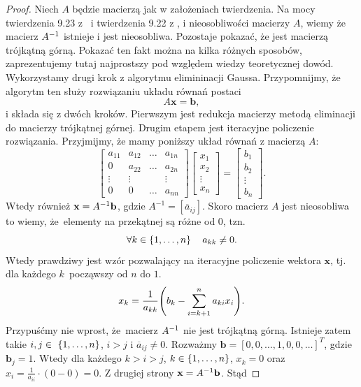 \documentclass[12pt,a4paper]{report}
\newcommand{\vr}[1]{\mathbf{#1}}
\newcommand{\mx}[1]{{#1}}
\begin{document}
\begin{proof}
Niech $\mx{A}$ będzie macierzą jak w założeniach twierdzenia.
Na mocy twierdzenia 9.23 z~\citep{poreda11} i twierdzenia 9.22 z \citep{poreda11}, i nieosobliwości macierzy $\mx{A}$, wiemy że macierz $\inverse{\mx{A}} $ istnieje i jest nieosobliwa. Pozostaje pokazać, że jest macierzą trójkątną górną. Pokazać ten fakt można na kilka różnych sposobów, zaprezentujemy tutaj najprostszy pod względem wiedzy teoretycznej dowód.
Wykorzystamy drugi krok z algorytmu elimininacji Gaussa. Przypomnijmy, że algorytm ten służy rozwiązaniu układu równań postaci 
$$
\mx{A} \vr{x} = \vr{b},
$$
i składa się z dwóch kroków. Pierwszym jest redukcja macierzy metodą eliminacji do macierzy trójkątnej górnej. Drugim etapem jest iteracyjne policzenie rozwiązania. Przyjmijmy, że mamy poniższy układ równań z macierzą $\mx{A}$:
$$
\begin{bmatrix}
a_{11} & a_{12} & \ldots & a_{1n} \\
0 & a_{22} & \ldots & a_{2n} \\
\vdots & \vdots & & \vdots\\
0 & 0 & \ldots & a_{nn}
\end{bmatrix}
\begin{bmatrix}
x_1 \\ x_2 \\ \vdots \\ x_n
\end{bmatrix}
=
\begin{bmatrix}
b_1 \\ b_2 \\ \vdots \\ b_n
\end{bmatrix}.
$$
Wtedy również $\vr{x} = \inverse{\mx{A}}\vr{b}$, gdzie $\mx{A}^{-1} = [\overline{a}_{ij}]$. Skoro macierz $\mx{A}$ jest nieosobliwa to wiemy, że~elementy na przekątnej są różne od $0$, tzn.
$$
\forall k \in \left\lbrace {1, \ldots, n} \right\rbrace \quad a_{kk} \neq 0.
$$
Wtedy prawdziwy jest wzór pozwalający na iteracyjne policzenie wektora $\vr{x}$, tj. dla każdego $k$~począwszy od $n$ do $1$.
\begin{equation}
x_k = \frac{1}{a_{kk}} \bracket{b_k - \sum_{i=k+1}^{n} a_{ki} x_{i}}.
\end{equation}
Przypuśćmy nie wprost, że~macierz $\inverse{\mx{A}}$ nie jest trójkątną górną. Istnieje zatem takie $i,j\in~\left\lbrace {1, \ldots, n} \right\rbrace$, $i > j$ i $\overline{a}_{ij} \neq 0 $. Rozważmy $\vr{b}= [0,0, \ldots, 1,0,0, \ldots]^{T}$, gdzie $\vr{b}_{j} = 1$. Wtedy dla każdego $k>i>j$, $k \in \left\lbrace {1, \ldots, n} \right\rbrace$, $x_{k} = 0$ oraz $x_{i} = \frac{1}{a_{ii}} \cdot(0 - 0 ) = 0$. Z drugiej strony $\vr{x} = \inverse{\mx{A}} \vr{b}$. Stąd 

\end{proof}
\end{document}
